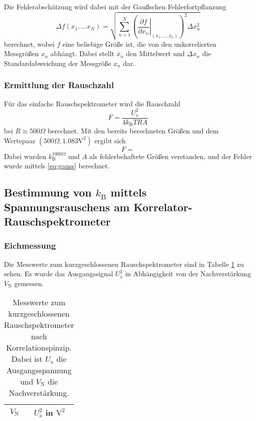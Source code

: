 		Die Fehlerabschätzung wird dabei mit der Gaußschen Fehlerfortpflanzung
		\begin{equation}
		\Delta f(x_1,\ldots x_N)
		=\sqrt{ \sum_{n=1}^N \left(\left.\frac{\partial f}{\partial x_n}\right|
		_{(\bar{x}_1,\ldots,\bar{x}_n)}\right)^2
		\Delta x_n ^2 } \label{eq:gauss}
		\end{equation}
		berechnet, wobei $f$ eine beliebige Größe ist, die von den unkorrelierten
		Messgrößen $x_n$ abhängt. Dabei  stellt $\bar{x}_n$ den Mittelwert und
		$\Delta x_n$ die Standardabweichung der Messgröße $x_n$ dar.


	\subsubsection{Ermittlung der Rauschzahl}
		Für das einfache Rauschspektrometer wird die Rauschzahl
		\begin{equation}
			F = \frac{U_\text{a}^2}{4 k_\text{B}T R A}
		\end{equation}
		bei $R\approx 500\Omega$ berechnet. Mit den bereits berechneten Größen und
		dem Wertepaar $(500\Omega,1.083 \text{V}^2)$ ergibt sich
		\begin{equation}
			F = 
		\end{equation}
		Dabei wurden $k_\text{B}^{1000\Omega}$ und $A$ als fehlerbehaftete Größen 
		verstanden, und der Fehler wurde mittels \eqref{eq:gauss} berechnet.






\clearpage
\subsection{Bestimmung von $k_\text{B}$ mittels Spannungsrauschens am
			Korrelator-Rauschspektrometer}

		\subsubsection{Eichmessung}

		Die Messwerte zum kurzgeschlossenen Rauschspektrometer sind
		in Tabelle \ref{tab:eichung_eigenrauschen_korr} zu sehen.
		Es wurde das Ausgangssignal $U^2_\text{a}$ in Abhängigkeit von
		der Nachverstärkung $V_\text{N}$ gemessen.

		\begin{table}[h]
		\centering
			\begin{tabular}{cc}
				\toprule \midrule
				$V_\text{N}$ & $U^2_\text{a}$ in $\text{V}^2$
				\\
				\midrule
				
				\midrule \bottomrule
			\end{tabular}
			\caption{Messwerte zum kurzgeschlossenen
			Rauschspektrometer nach Korrelationspinzip. Dabei ist $U_\text{a}$ die
			Ausgangsspannung und $V_\text{N}$ die Nachverstärkung.}
			\label{tab:eichung_eigenrauschen_korr}
		\end{table}

